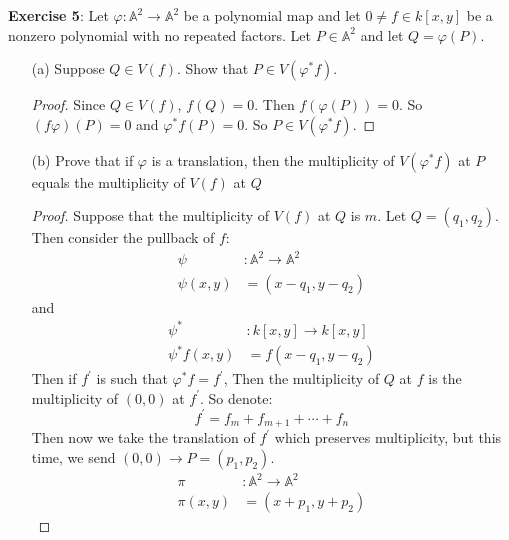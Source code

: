 \documentclass{article}
\begin{document}
\textbf{Exercise 5}: Let $\varphi: \mathbb{A}^{2} \rightarrow \mathbb{A}^{2}$ be a polynomial map and let $0 \neq f \in k[x, y]$ be a nonzero polynomial with no repeated factors. Let $P \in \mathbb{A}^{2}$ and let $Q = \varphi(P)$.
    \begin{itemize}
        \item [(a)] Suppose $Q \in V(f)$. Show that $P \in V(\varphi^{*}f)$.
            \begin{proof}
                Since $Q \in V(f)$, $f(Q) = 0$. Then $f(\varphi(P)) = 0$. So $(f\varphi)(P) = 0$ and $\varphi^{*}f(P) = 0$. So $P \in V(\varphi^{*}f)$.
            \end{proof}

        \item [(b)] Prove that if $\varphi$ is a translation, then the multiplicity of $V(\varphi^{*}f)$ at $P$ equals the multiplicity of $V(f)$ at $Q$
            \begin{proof}
                Suppose that the multiplicity of $V(f)$ at $Q$ is $m$. Let $Q = (q_{1}, q_{2})$. Then consider the pullback of $f$:
                    \begin{align*}
                        \psi &: \mathbb{A}^{2} \rightarrow \mathbb{A}^{2} \\
                        \psi(x, y) &= (x - q_{1}, y - q_{2})                      
                    \end{align*}
                and 
                    \begin{align*}
                        \psi^{*} &: k[x, y] \rightarrow k[x,y ] \\
                        \psi^{*}f(x, y)  &= f(x - q_{1}, y - q_{2})       
                    \end{align*}
                Then if $f^{\prime}$ is such that $\varphi^{*}f = f^{\prime}$, Then the multiplicity of $Q$ at $f$ is the multiplicity of $(0, 0)$ at $f^{\prime}$. So denote:
                    \begin{equation*}
                        f^{\prime} = f_{m} + f_{m + 1} + \cdots + f_{n}
                    \end{equation*}
                Then now we take the translation of $f^{\prime}$ which preserves multiplicity, but this time, we send $(0, 0) \rightarrow P  = (p_{1}, p_{2})$.
                    \begin{align*}
                        \pi       &: \mathbb{A}^{2} \rightarrow \mathbb{A}^{2} \\
                        \pi(x, y) &= (x + p_{1}, y + p_{2})                              

\end{align*}
\end{proof}
\end{itemize}
\end{document}
